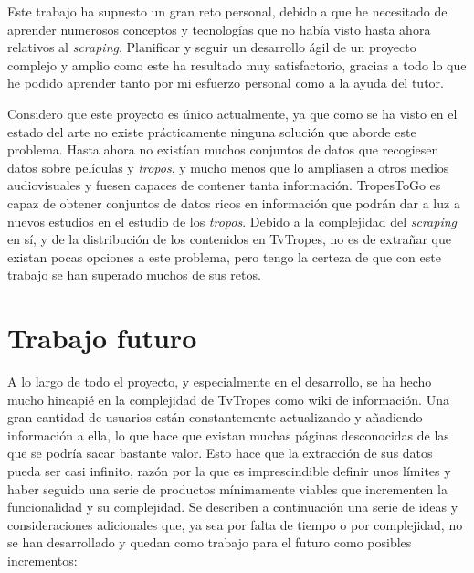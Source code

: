Este trabajo ha supuesto un gran reto personal, debido a que he necesitado de
aprender numerosos conceptos y tecnologías que no había visto hasta ahora
relativos al \textit{scraping}. Planificar y seguir un desarrollo ágil de un
proyecto complejo y amplio como este ha resultado muy satisfactorio, gracias a
todo lo que he podido aprender tanto por mi esfuerzo personal como a la
ayuda del tutor.

Considero que este proyecto es único actualmente, ya que como se ha visto en el
estado del arte no existe prácticamente ninguna solución que aborde este
problema. Hasta ahora no existían muchos conjuntos de datos que recogiesen datos
sobre películas y \textit{tropos}, y mucho menos que lo ampliasen a otros medios
audiovisuales y fuesen capaces de contener tanta información. TropesToGo es
capaz de obtener conjuntos de datos ricos en información que podrán dar a luz a
nuevos estudios en el estudio de los \textit{tropos}. Debido a la complejidad
del \textit{scraping} en sí, y de la distribución de los contenidos en TvTropes,
no es de extrañar que existan pocas opciones a este problema, pero tengo la
certeza de que con este trabajo se han superado muchos de sus retos.

\section{Trabajo futuro}
A lo largo de todo el proyecto, y especialmente en el desarrollo, se ha hecho
mucho hincapié en la complejidad de TvTropes como wiki de información. Una gran
cantidad de usuarios están constantemente actualizando y añadiendo información a
ella, lo que hace que existan muchas páginas desconocidas de las que se podría
sacar bastante valor. Esto hace que la extracción de sus datos pueda ser casi
infinito, razón por la que es imprescindible definir unos límites y haber
seguido una serie de productos mínimamente viables que incrementen la
funcionalidad y su complejidad. Se describen a continuación una serie de ideas y
consideraciones adicionales que, ya sea por falta de tiempo o por complejidad,
no se han desarrollado y quedan como trabajo para el futuro como posibles
incrementos:

